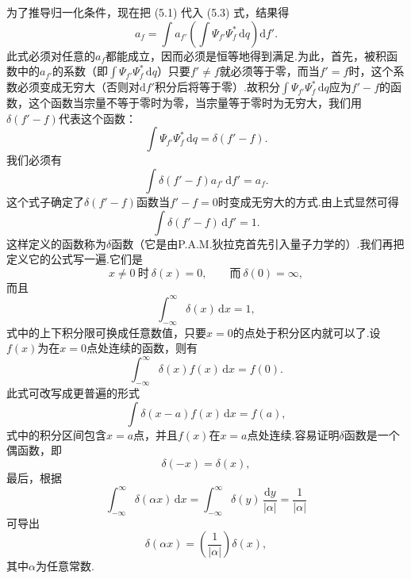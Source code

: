 为了推导归一化条件，现在把 (5.1) 代入 (5.3) 式，结果得
\begin{equation*}
  a_f=\int a_{f'}\left(\int\varPsi_{f'}\varPsi_f^{*}\,\mathrm{d}q\right)\mathrm{d}f'.
\end{equation*}
此式必须对任意的$a_f$都能成立，因而必须是恒等地得到满足.为此，首先，被积函数中的$a_{f'}$的系数（即$\int\varPsi_{f'}\varPsi_f^{*}\,\mathrm{d}q$）只要$f'\neq f$就必须等于零，而当$f'=f$时，这个系数必须变成无穷大（否则对$\mathrm{d}f'$积分后将等于零）.故积分$\int\varPsi_{f'}\varPsi_f^{*}\,\mathrm{d}q$应为$f'-f$的函数，这个函数当宗量不等于零时为零，当宗量等于零时为无穷大，我们用$\delta(f'-f)$代表这个函数：
\begin{equation}
  \int\varPsi_{f'}\varPsi_f^{*}\,\mathrm{d}q=\delta(f'-f).
\end{equation}
我们必须有
\begin{equation*}
  \int\delta(f'-f)a_{f'}\,\mathrm{d}f'=a_f.
\end{equation*}
这个式子确定了$\delta(f'-f)$函数当$f'-f=0$时变成无穷大的方式.由上式显然可得
\begin{equation*}
  \int\delta(f'-f)\,\mathrm{d}f'=1.
\end{equation*}
这样定义的函数称为$\delta$函数（它是由P.A.M.狄拉克首先引入量子力学的）.我们再把定义它的公式写一遍.它们是
\begin{equation}
  x\neq0\ \text{时}\ \delta(x)=0,\qquad\text{而}\ \delta(0)=\infty,
\end{equation}
而且
\begin{equation}
  \int_{-\infty}^{\infty}\delta(x)\,\mathrm{d}x=1,
\end{equation}
式中的上下积分限可换成任意数值，只要$x=0$的点处于积分区内就可以了.设$f(x)$为在$x=0$点处连续的函数，则有
\begin{equation}
  \int_{-\infty}^{\infty}\delta(x)f(x)\,\mathrm{d}x=f(0).
\end{equation}
此式可改写成更普遍的形式
\begin{equation}
  \int\delta(x-a)f(x)\,\mathrm{d}x=f(a),
\end{equation}
式中的积分区间包含$x=a$点，并且$f(x)$在$x=a$点处连续.容易证明$\delta$函数是一个偶函数，即
\begin{equation}
  \delta(-x)=\delta(x),
\end{equation}
最后，根据
\begin{equation*}
  \int_{-\infty}^{\infty}\delta(\alpha x)\,\mathrm{d}x
  =\int_{-\infty}^{\infty}\delta(y)\,\frac{\mathrm{d}y}{|\alpha|}
  =\frac{1}{|\alpha|}
\end{equation*}
可导出
\begin{equation}
  \delta(\alpha x)=\left(\frac{1}{|\alpha|}\right)\delta(x),
\end{equation}
其中$\alpha$为任意常数.

